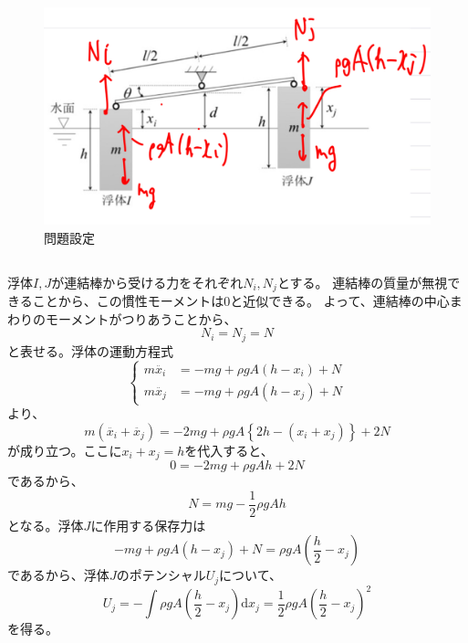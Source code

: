 \documentclass[a4paper]{jsarticle}
\begin{document}
\section{}
\begin{figure}[htb]
  \centering
  \includegraphics[width=0.6\hsize]{fig4.png}
  \caption{問題設定}
\end{figure}

\subsection{}
\subsubsection{}
浮体$I,J$が連結棒から受ける力をそれぞれ$N_i, N_j$とする。
連結棒の質量が無視できることから、この慣性モーメントは0と近似できる。
よって、連結棒の中心まわりのモーメントがつりあうことから、
\begin{equation}
  N_i =  N_j = N
\end{equation}
と表せる。浮体の運動方程式
\begin{equation}
  \begin{cases}
    m \ddot{x_i} &= -m g + \rho g A (h - x_i) + N \\
    m \ddot{x_j} &= -m g + \rho g A (h - x_j) + N
  \end{cases}
\end{equation}
より、
\begin{equation}
  m \left(\ddot{x_i} + \ddot{x_j}\right) = 
  -2 m g + \rho g A \left\{2 h - (x_i + x_j)\right\} + 2 N
\end{equation}
が成り立つ。ここに$x_i + x_j = h$を代入すると、
\begin{equation}
  0 = -2 m g + \rho g A h + 2 N
\end{equation}
であるから、
\begin{equation}
  N = mg - \frac{1}{2} \rho g A h
\end{equation}
となる。浮体$J$に作用する保存力は
\begin{equation}
  -mg + \rho g A (h - x_j) + N = \rho g A \left(\frac{h}{2} - x_j\right)
\end{equation}
であるから、浮体$J$のポテンシャル$U_j$について、
\begin{equation}
  U_j = -\int \rho g A \left(\frac{h}{2} - x_j\right) \mathrm{d} x_j
  = \frac{1}{2} \rho g A \left(\frac{h}{2} - x_j\right)^2
\end{equation}
を得る。
\end{document}
